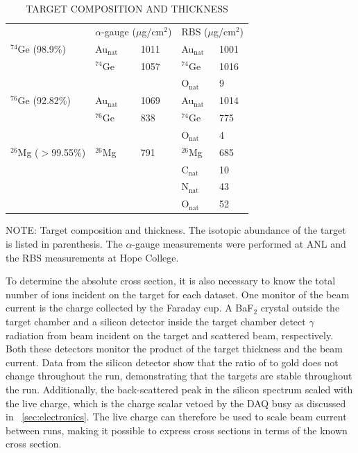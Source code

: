\begin{table}[htp]
\centering
\caption[\uppercase{target composition and thickness}]{\uppercase{target composition and thickness}}
\label{tab:targets}
\begin{tabular}{lllll}
 & \multicolumn{2}{c}{$\alpha$-gauge ($\mu$g/cm$^2$)} & \multicolumn{2}{c}{RBS ($\mu$g/cm$^2$)} \\
\cline{2-3}\cline{4-5}
$^{74}$Ge (98.9\%) & Au$_{\text{nat}}$ & 1011 & Au$_{\text{nat}}$ & 1001 \\
          & $^{74}$Ge & 1057 & $^{74}$Ge & 1016 \\
          &           &      & O$_{\text{nat}}$ & 9 \\[0.35cm]

$^{76}$Ge (92.82\%) & Au$_{\text{nat}}$ & 1069 & Au$_{\text{nat}}$ & 1014 \\
          & $^{76}$Ge & 838 & $^{74}$Ge & 775 \\
          &           &      & O$_{\text{nat}}$ & 4 \\[0.35cm]

$^{26}$Mg ($>$99.55\%) & $^{26}$Mg & 791 & $^{26}$Mg & 685 \\
          &           &      & C$_{\text{nat}}$ & 10 \\
          &           &      & N$_{\text{nat}}$ & 43 \\
          &           &      & O$_{\text{nat}}$ & 52 \\
\end{tabular}
\begin{flushleft}
\small NOTE:
Target composition and thickness.  The isotopic abundance of the target is listed in parenthesis.  The $\alpha$-gauge measurements were performed at ANL and the RBS measurements at Hope College.
\end{flushleft}
\end{table}

To determine the absolute cross section, it is also necessary to know the total number of  ions incident on the target for each dataset.  One monitor of the beam current is the charge collected by the Faraday cup.  A BaF$_2$ crystal outside the target chamber and a silicon detector inside the target chamber detect $\gamma$ radiation from beam incident on the target and scattered  beam, respectively.  Both these detectors monitor the product of the target thickness and the beam current.  Data from the silicon detector show that the ratio of \GeTargets to gold does not change throughout the run, demonstrating that the targets are stable throughout the run.  Additionally, the back-scattered peak in the silicon spectrum scaled with the live charge, which is the charge scalar vetoed by the DAQ busy as discussed in {\sect}~\ref{sec:electronics}.  The live charge can therefore be used to scale beam current between runs, making it possible to express \reaction cross sections in terms of the known \MgReaction cross section.

